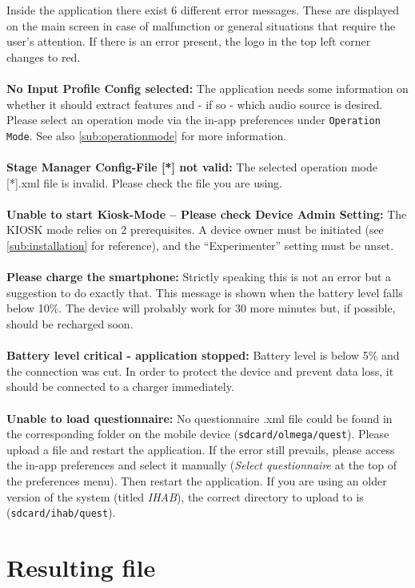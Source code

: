 \documentclass[11pt,a4paper,titlepage]{article}
\begin{document}
Inside the application there exist 6 different error messages. These are displayed on the main screen in case of malfunction or general situations that require the user's attention. If there is an error present, the logo in the top left corner changes to red.\\
\\
\textbf{No Input Profile Config selected:} The application needs some information on whether it should extract features and - if so - which audio source is desired. Please select an operation mode via the in-app preferences under \texttt{Operation Mode}. See also \ref{sub:operationmode} for more information. \\
\\
\textbf{Stage Manager Config-File [*] not valid:} The selected operation mode [*].xml file is invalid. Please check the file you are using.\\
\\
\textbf{Unable to start Kiosk-Mode -- Please check Device Admin Setting:} The KIOSK mode relies on 2 prerequisites. A device owner must be initiated (see \ref{sub:installation} for reference), and the ``Experimenter'' setting must be unset.\\
\\
\textbf{Please charge the smartphone:} Strictly speaking this is not an error but a suggestion to do exactly that. This message is shown when the battery level falls below 10\%. The device will probably work for 30 more minutes but, if possible, should be recharged soon.\\
\\
\textbf{Battery level critical - application stopped:} Battery level is below 5\% and the connection was cut. In order to protect the device and prevent data loss, it should be connected to a charger immediately.\\
\\
\textbf{Unable to load questionnaire:} No questionnaire .xml file could be found in the corresponding folder on the mobile device (\texttt{sdcard/olmega/quest}). Please upload a file and restart the application. If the error still prevails, please access the in-app preferences and select it manually (\emph{Select questionnaire} at the top of the preferences menu). Then restart the application. If you are using an older version of the system (titled \emph{IHAB}), the correct directory to upload to is (\texttt{sdcard/ihab/quest}).

\clearpage

\section{Resulting file}
\end{document}
